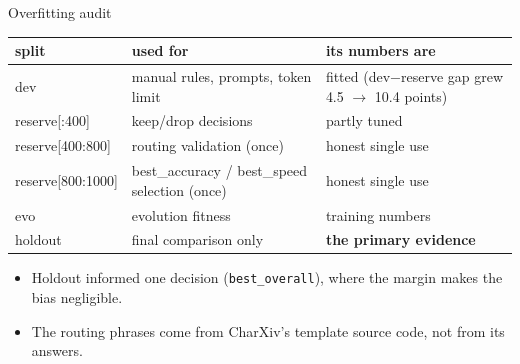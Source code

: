 \documentclass[aspectratio=169,10pt]{beamer}
\begin{document}
\begin{frame}{Overfitting audit}
\small
\begin{tabularx}{\linewidth}{@{}llX@{}}
\toprule
split & used for & its numbers are \\
\midrule
dev & manual rules, prompts, token limit & fitted (dev$-$reserve gap grew 4.5 $\rightarrow$ 10.4 points) \\
reserve[:400] & keep/drop decisions & partly tuned \\
reserve[400:800] & routing validation (once) & honest single use \\
reserve[800:1000] & best\_accuracy / best\_speed selection (once) & honest single use \\
evo & evolution fitness & training numbers \\
holdout & final comparison only & \textbf{the primary evidence} \\
\bottomrule
\end{tabularx}
\vspace{0.8em}
\begin{itemize}\small
  \item Holdout informed one decision (\texttt{best\_overall}), where the margin makes the bias negligible.
  \item The routing phrases come from CharXiv's template source code, not from its answers.
\end{itemize}
\end{frame}
\end{document}
